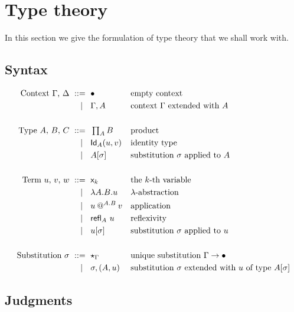 \section{Type theory}
\label{sec:type-theory}

In this section we give the formulation of type theory that we shall work with.

\subsection{Syntax}
\label{sec:syntax}

\begin{align*}
  \text{Context $\Gamma$, $\Delta$}
    \ \mathrel{{:}{:}{=}}\    {}& \bullet                && \text{empty context} \\
    \ \mid\ \  {}& \Gamma, A       && \text{context $\Gamma$ extended with $A$} \\
  \\
  \text{Type $A$, $B$, $C$}
    \ \mathrel{{:}{:}{=}}\    {}& \mathop{\textstyle\prod_{A}} B             && \text{product}\\
    \ \mid\ \  {}& \mathsf{Id}_{A}(u,v)        && \text{identity type} \\
    \ \mid\ \  {}& A[\sigma]         && \text{substitution $\sigma$ applied to $A$} \\
  \\
  \text{Term $u$, $v$, $w$}
    \ \mathrel{{:}{:}{=}}\    {}& \mathsf{x}_{k}                  && \text{the $k$-th variable} \\
    \ \mid\ \  {}& \lambda A . B . u         && \text{$\lambda$-abstraction} \\
    \ \mid\ \  {}& u\mathbin{@^{A.B}} v   && \text{application} \\
    \ \mid\ \  {}& {\mathsf{refl}_{A}}\  u            && \text{reflexivity} \\
    \ \mid\ \  {}& u[\sigma]        && \text{substitution $\sigma$ applied to $u$} \\
  \\
  \text{Substitution $\sigma$}
    \ \mathrel{{:}{:}{=}}\    {}& \mathsf{\star}_{\Gamma}              && \text{unique substitution $\Gamma \to \bullet$} \\
    \ \mid\ \  {}& \sigma,(A,u) && \text{substitution $\sigma$ extended with $u$ of type $A[\sigma]$}
\end{align*}

\subsection{Judgments}
\label{sec:judgments}

